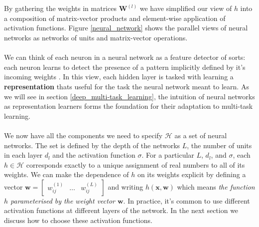 \\\\
By gathering the weights in matrices $\mathbf{W}^{(l)}$ we have simplified our view of $h$ into a composition of matrix-vector products and element-wise application of activation functions. Figure \ref{neural_network} shows the parallel views of neural networks as networks of units and matrix-vector operations.
\\\\
We can think of each neuron in a neural network as a feature detector of sorts: each neuron learns to detect the presence of a pattern implicitly defined by it's incoming weights \citep{goodfellow16}. In this view, each hidden layer is tasked with learning a \textbf{representation} thats useful for the task the neural network meant to learn. As we will see in section \ref{deep_multi-task_learning}, the intuition of neural networks as representation learners forms the foundation for their adaptation to multi-task learning.
\\\\
We now have all the components we need to specify $\mathcal{H}$ as a set of neural networks. The set is defined by the depth of the networks $L$, the number of units in each layer $d_l$ and the activation function $\sigma$.
For a particular $L$, $d_l$, and $\sigma$, each $h \in \mathcal{H}$ corresponds exactly to a unique assignment of real numbers to all of its weights. We can make the dependence of $h$ on its weights explicit by defining a vector $\mathbf{w} = \begin{bmatrix} w^{(1)}_{ij} & \dots & w^{(L)}_{ij}\end{bmatrix}$ and writing $h(\mathbf{x}, \mathbf{w})$ which means \textit{the function $h$ parameterised by the weight vector $\mathbf{w}$}. In practice, it's common to use different activation functions at different layers of the network. In the next section we discuss how to choose these activation functions.

